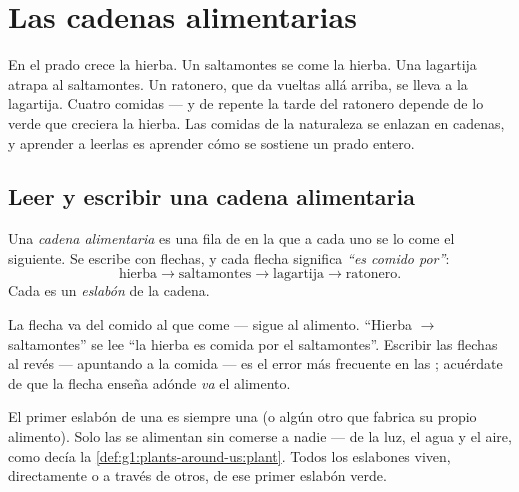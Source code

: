 \chapter{Las cadenas alimentarias}\label{ch:g3:food-chains}

En el prado crece la hierba. Un saltamontes se come la hierba. Una
lagartija atrapa al saltamontes. Un ratonero, que da vueltas allá
arriba, se lleva a la lagartija. Cuatro comidas --- y de repente la
tarde del ratonero depende de lo verde que creciera la hierba. Las
comidas de la naturaleza se enlazan en cadenas, y aprender a leerlas
es aprender cómo se sostiene un prado entero.

\section{Leer y escribir una cadena alimentaria}

\begin{definition}\label{def:g3:food-chains:chain}
Una \emph{cadena alimentaria} es una fila de
 en la que a cada uno se lo come el siguiente. Se escribe
con flechas, y cada flecha significa \emph{``es comido
por''}:
\[
\text{hierba} \longrightarrow \text{saltamontes}
\longrightarrow \text{lagartija} \longrightarrow \text{ratonero}.
\]
Cada  es un \emph{eslabón} de la cadena.
\end{definition}

\begin{remark}\label{rem:g3:food-chains:arrow}
La flecha va del comido al que come --- sigue al alimento. ``Hierba
$\rightarrow$ saltamontes'' se lee ``la hierba es comida por el
saltamontes''. Escribir las flechas al revés --- apuntando a la
comida --- es el error más frecuente en las ;
acuérdate de que la flecha enseña adónde \emph{va} el alimento.
\end{remark}

\begin{proposition}\label{prop:g3:food-chains:start}
El primer eslabón de una  es siempre una  (o
algún otro  que fabrica su propio alimento). Solo las 
se alimentan sin comerse a nadie --- de la luz, el agua y el aire,
como decía la \cref{def:g1:plants-around-us:plant}. Todos los eslabones
 viven, directamente o a través de otros, de ese primer
eslabón verde.
\end{proposition}
\admitted

